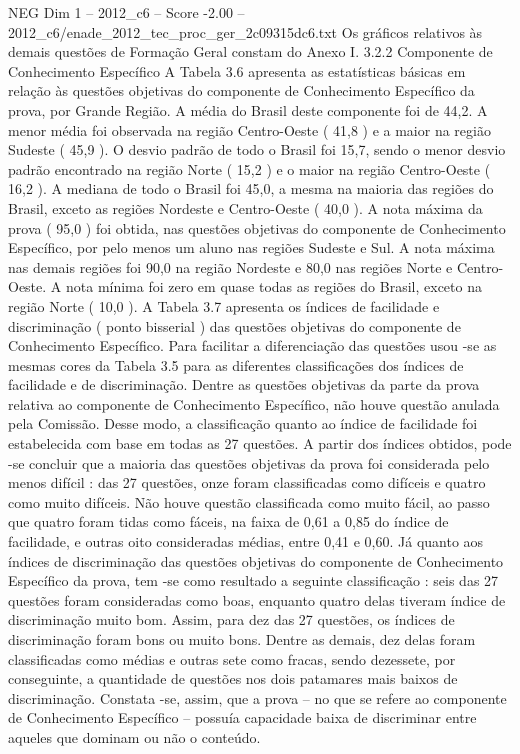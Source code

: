 \begin{textsample}{NEG Dim 1 – 2012\_c6 – Score -2.00 – 2012\_c6/enade\_2012\_tec\_proc\_ger\_2c09315dc6.txt}
Os gráficos relativos às demais questões de Formação Geral constam do Anexo I. 3.2.2 Componente de Conhecimento Específico A Tabela 3.6 apresenta as estatísticas básicas em relação às questões objetivas do componente de Conhecimento Específico da prova, por Grande Região.
A média do Brasil deste componente foi de 44,2.
A menor média foi observada na região Centro-Oeste ( 41,8 ) e a maior na região Sudeste ( 45,9 ).
O desvio padrão de todo o Brasil foi 15,7, sendo o menor desvio padrão encontrado na região Norte ( 15,2 ) e o maior na região Centro-Oeste ( 16,2 ).
A mediana de todo o Brasil foi 45,0, a mesma na maioria das regiões do Brasil, exceto as regiões Nordeste e Centro-Oeste ( 40,0 ).
A nota máxima da prova ( 95,0 ) foi obtida, nas questões objetivas do componente de Conhecimento Específico, por pelo menos um aluno nas regiões Sudeste e Sul.
A nota máxima nas demais regiões foi 90,0 na região Nordeste e 80,0 nas regiões Norte e Centro-Oeste.
A nota mínima foi zero em quase todas as regiões do Brasil, exceto na região Norte ( 10,0 ).
A Tabela 3.7 apresenta os índices de facilidade e discriminação ( ponto bisserial ) das questões objetivas do componente de Conhecimento Específico.
Para facilitar a diferenciação das questões usou -se as mesmas cores da Tabela 3.5 para as diferentes classificações dos índices de facilidade e de discriminação.
Dentre as questões objetivas da parte da prova relativa ao componente de Conhecimento Específico, não houve questão anulada pela Comissão.
Desse modo, a classificação quanto ao índice de facilidade foi estabelecida com base em todas as 27 questões.
A partir dos índices obtidos, pode -se concluir que a maioria das questões objetivas da prova foi considerada pelo menos difícil : das 27 questões, onze foram classificadas como difíceis e quatro como muito difíceis.
Não houve questão classificada como muito fácil, ao passo que quatro foram tidas como fáceis, na faixa de 0,61 a 0,85 do índice de facilidade, e outras oito consideradas médias, entre 0,41 e 0,60.
Já quanto aos índices de discriminação das questões objetivas do componente de Conhecimento Específico da prova, tem -se como resultado a seguinte classificação : seis das 27 questões foram consideradas como boas, enquanto quatro delas tiveram índice de discriminação muito bom.
Assim, para dez das 27 questões, os índices de discriminação foram bons ou muito bons.
Dentre as demais, dez delas foram classificadas como médias e outras sete como fracas, sendo dezessete, por conseguinte, a quantidade de questões nos dois patamares mais baixos de discriminação.
Constata -se, assim, que a prova – no que se refere ao componente de Conhecimento Específico – possuía capacidade baixa de discriminar entre aqueles que dominam ou não o conteúdo.

\end{textsample}
